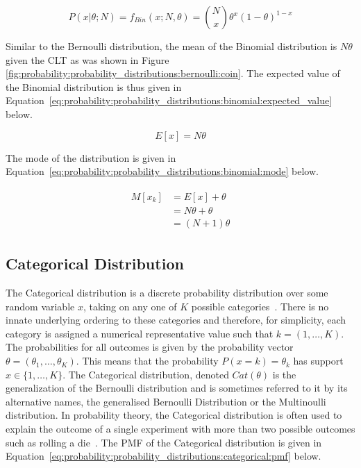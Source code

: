 \begin{equation}
      \label{eq:probability:probability_distributions:binomial:pmf}
      P(x \vert \theta; N) = f_{Bin}(x; N, \theta) = \binom{N}{x} \theta^{x}(1-\theta)^{1-x}
\end{equation}

Similar to the Bernoulli distribution, the mean of the Binomial distribution is $N\theta$ given the \ac{CLT} as was shown in Figure \ref{fig:probability:probability_distributions:bernoulli:coin}. The expected value of the Binomial distribution is thus given in Equation~\eqref{eq:probability:probability_distributions:binomial:expected_value} below.

\begin{equation}
      \label{eq:probability:probability_distributions:binomial:expected_value}
      E[x] = N\theta
\end{equation}

The mode of the distribution is given in Equation~\eqref{eq:probability:probability_distributions:binomial:mode} below.

\begin{align}
      \label{eq:probability:probability_distributions:binomial:mode}
      \begin{split}
            M[x_{k}] &= E[x] + \theta \\
            &= N\theta  + \theta \\
            &= (N  + 1)\theta
      \end{split}
\end{align}



\subsection{Categorical Distribution}
\label{sec:probability:probability_distributions:categorical}

The Categorical distribution is a discrete probability distribution over some random variable $x$, taking on any one of $K$ possible categories~\cite{ref:wackerly:2014}. There is no innate underlying ordering to these categories and therefore, for simplicity, each category is assigned a numerical representative value such that $k = (1, \dots, K)$. The probabilities for all outcomes is given by the probability vector $\theta = (\theta_{1}, \dots, \theta_{K})$.  This means that the probability $P(x=k)=\theta_{k}$ has support $x \in \{1, \dots, K\}$. The Categorical distribution, denoted $Cat(\theta)$ is the generalization of the Bernoulli distribution and is sometimes referred to it by its alternative names, the generalised Bernoulli Distribution or the Multinoulli distribution. In probability theory, the Categorical distribution is often used to explain the outcome of a single experiment with more than two possible outcomes such as rolling a die~\cite{ref:wackerly:2014}. The \ac{PMF} of the Categorical distribution is given in Equation~\eqref{eq:probability:probability_distributions:categorical:pmf} below.

